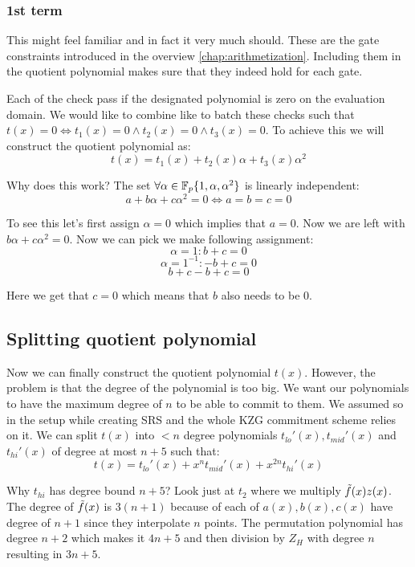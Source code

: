 \subsubsection{1st term}
This might feel familiar and in fact it very much should. These are the gate constraints introduced in the overview \eqref{chap:arithmetization}. Including them in the quotient polynomial makes sure that they indeed hold for each gate. 

Each of the check pass if the designated polynomial is zero on the evaluation domain. We would like to combine like to batch these checks such that $t(x) = 0 \iff t_1(x) = 0 \wedge t_2(x) = 0 \wedge t_3(x) = 0$. To achieve this we will construct the quotient polynomial as:
$$t(x) = t_1(x) + t_2(x)\alpha + t_3(x)\alpha^2$$

Why does this work? The set $\forall \alpha \in \mathbb{F}_p \{1, \alpha, \alpha^2\}$ is linearly independent:
$$a + b\alpha + c\alpha^2 = 0 \iff a = b = c = 0 $$

To see this let's first assign $\alpha = 0$ which implies that $a = 0$. Now we are left with $b\alpha + c\alpha^2 = 0$. Now we can pick we make following assignment:
$$\alpha = 1: b + c = 0$$
$$\alpha = 1^{-1}: -b + c = 0$$
$$b+c -b +c = 0$$

Here we get that $c = 0$ which means that $b$ also needs to be 0.


\subsection{Splitting quotient polynomial}

Now we can finally construct the quotient polynomial $t(x)$. However, the problem is that the degree of the polynomial is too big. We want our polynomials to have the maximum degree of $n$ to be able to commit to them. We assumed so in the setup while creating SRS and the whole KZG commitment scheme relies on it. We can split $t(x)$ into $< n$ degree polynomials $t_{lo}'(x), t_{mid}'(x)$ and $t_{hi}'(x)$ of degree at most $n+5$ such that: $$t(x) = t_{lo}'(x) + x^nt_{mid}'(x) + x^{2n}t_{hi}'(x)$$

Why $t_{hi}$ has degree bound $n+5$? Look just at $t_2$ where we multiply $\Tilde{f}(x)z(x)$. The degree of $\Tilde{f}(x)$ is $3(n+1)$ because of each of $a(x), b(x), c(x)$ have degree of $n+1$ since they interpolate $n$ points. The permutation polynomial has degree $n+2$ which makes it $4n+5$ and then division by $Z_H$ with degree $n$ resulting in $3n+5$.



